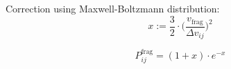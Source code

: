         Correction using Maxwell-Boltzmann distribution:
        \begin{equation}
            x:=\frac{3}{2}\cdot\bigg(
                \frac{v_\text{frag}}{\Delta v_{ij}}
            \bigg)^2
        \end{equation}
        
        \begin{equation}
            P^\text{frag}_{ij}=(1+x)\cdot e^{-x}
        \end{equation}

        

        \clearpage


        

        
        
        

